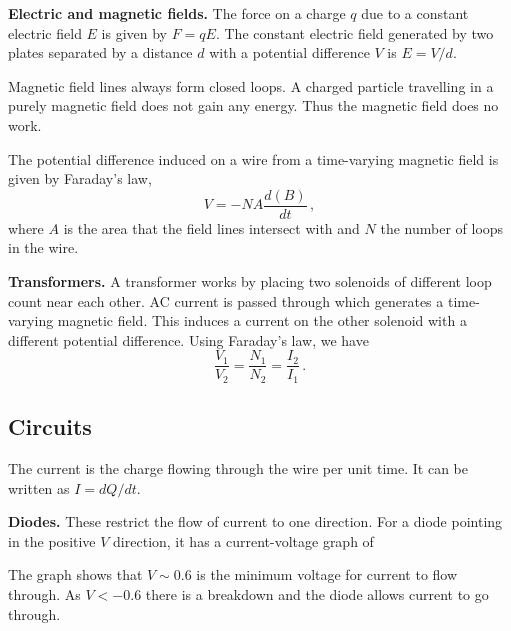 \documentclass{article}
\begin{document}
\textbf{Electric and magnetic fields.} The force on a charge $q$ due to a constant electric field $E$ is given by $F=qE$. The constant electric field generated by two plates separated by a distance $d$ with a potential difference $V$ is $E=V/d$.

Magnetic field lines always form closed loops. A charged particle travelling in a purely magnetic field does not gain any energy. Thus the magnetic field does no work.

The potential difference induced on a wire from a time-varying magnetic field is given by Faraday's law,
\[
V=-NA\frac{d(B)}{dt}\,,
\]
where $A$ is the area that the field lines intersect with and $N$ the number of loops in the wire.

\textbf{Transformers.} A transformer works by placing two solenoids of different loop count near each other. AC current is passed through which generates a time-varying magnetic field. This induces a current on the other solenoid with a different potential difference. Using Faraday's law, we have
\[
\frac{V_1}{V_2} = \frac{N_1}{N_2} = \frac{I_2}{I_1}\,.
\]

\subsection{Circuits} The current is the charge flowing through the wire per unit time. It can be written as $I=dQ/dt$.

\textbf{Diodes.} These restrict the flow of current to one direction. For a diode pointing in the positive $V$ direction, it has a current-voltage graph of
\begin{figure}[H]
    \centering
\end{figure}
The graph shows that $V\sim0.6$ is the minimum voltage for current to flow through. As $V<-0.6$ there is a breakdown and the diode allows current to go through.
\end{document}
